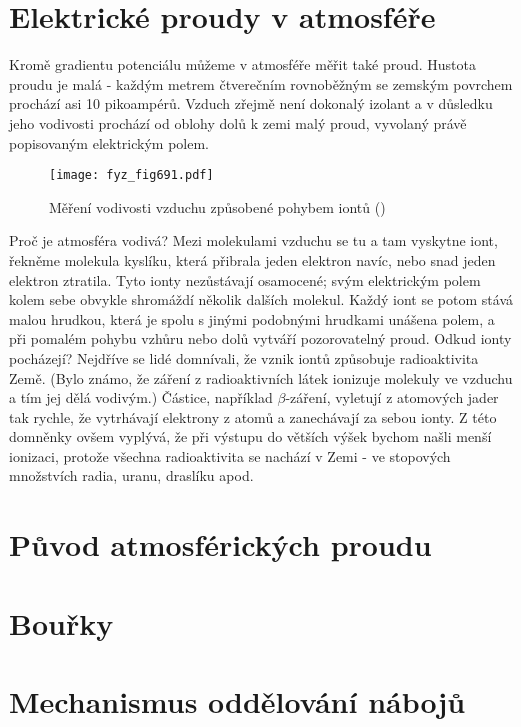   \section{Elektrické proudy v atmosféře}\label{fyz:IIchapIXsecII}   
    Kromě gradientu potenciálu můžeme v atmosféře měřit také proud. Hustota proudu je malá - každým
    metrem čtverečním rovnoběžným se zemským povrchem prochází asi \num{10} pikoampérů. Vzduch
    zřejmě není dokonalý izolant a v důsledku jeho vodivosti prochází od oblohy dolů k zemi malý
    proud, vyvolaný právě popisovaným elektrickým polem.

    \begin{figure}[ht!] %
      \centering
      \texttt{[image: fyz\_fig691.pdf]}
      \caption{Měření vodivosti vzduchu způsobené pohybem iontů
               (\cite[s.~707]{Feynman02})}
      \label{fyz:fig691}
    \end{figure}

    Proč je atmosféra vodivá? Mezi molekulami vzduchu se tu a tam vyskytne iont, řekněme molekula
    kyslíku, která přibrala jeden elektron navíc, nebo snad jeden elektron ztratila. Tyto ionty
    nezůstávají osamocené; svým elektrickým polem kolem sebe obvykle shromáždí několik dalších
    molekul. Každý iont se potom stává malou hrudkou, která je spolu s jinými podobnými hrudkami
    unášena polem, a při pomalém pohybu vzhůru nebo dolů vytváří pozorovatelný proud. Odkud ionty
    pocházejí? Nejdříve se lidé domnívali, že vznik iontů způsobuje radioaktivita Země. (Bylo známo,
    že záření z radioaktivních látek ionizuje molekuly ve vzduchu a tím jej dělá vodivým.) Částice,
    například \(\beta\)-záření, vyletují z atomových jader tak rychle, že vytrhávají elektrony z
    atomů a zanechávají za sebou ionty. Z této domněnky ovšem vyplývá, že při výstupu do větších
    výšek bychom našli menší ionizaci, protože všechna radioaktivita se nachází v Zemi - ve
    stopových množstvích radia, uranu, draslíku apod.

  \section{Původ atmosférických proudu}\label{fyz:IIchapIXsecIII}
  \section{Bouřky}\label{fyz:IIchapIXsecIV}
  \section{Mechanismus oddělování nábojů}\label{fyz:IIchapIXsecV}
